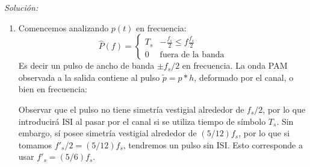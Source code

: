\documentclass[a4paper,11pt]{article}
\newenvironment{solucion}[1][]{
\noindent \large \textsl{Solución:} \ifthenelse{\equal{#1}{}}{}{\emph{(#1)}}

\smallskip
}{
\bigskip
}
\begin{document}
\begin{solucion}

        \begin{enumerate}
        
              \item Comencemos analizando $p(t)$ en frecuencia:
                \begin{equation*}
                        \hat{P}(f) = \begin{cases}
                        T_s & -\frac{f_s}{2} \leqslant f \frac{f_s}{2} \\
                        0 & \textrm{fuera de la banda}
                        \end{cases}
                \end{equation*}
                Es decir un pulso de ancho de banda $\pm f_s/2$ en frecuencia. La onda PAM observada a la salida contiene al pulso $\tilde{p} = p*h$, deformado por el canal, o bien en frecuencia:
                \begin{center}
                \end{center}
                Observar que el pulso no tiene simetría vestigial alrededor de $f_s/2$, por lo que introducirá ISI al pasar por el canal si se utiliza tiempo de símbolo $T_s$. Sin embargo, sí posee simetría vestigial alrededor de $(5/12)f_s$, por lo que si tomamos $f'_s/2 = (5/12)f_s$, tendremos un pulso sin ISI. Esto corresponde a usar $f'_s = (5/6)f_s$.


\end{enumerate}
\end{solucion}
\end{document}
